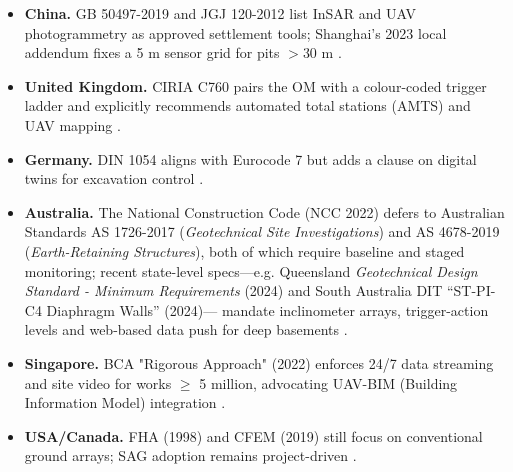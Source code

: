 \documentclass[preprint,11pt,authoryear,3p]{elsarticle}
\begin{document}
\begin{itemize}

    \item \textbf{China.} GB 50497-2019 and JGJ 120-2012 list InSAR and UAV photogrammetry as approved settlement tools; Shanghai's 2023 local addendum fixes a 5 m sensor grid for pits $>30$ m \citep{GB50497:2019,ShanghaiAddendum2023}.

    \item \textbf{United Kingdom.} CIRIA C760 pairs the OM with a colour-coded trigger ladder and explicitly recommends automated total stations (AMTS) and UAV mapping \citep{CIRIA760}.

    \item \textbf{Germany.} DIN 1054 aligns with Eurocode 7 but adds a clause on digital twins for excavation control \citep{DIN1054:2021-04}.
    
    \item \textbf{Australia.}  The National Construction Code (NCC 2022) defers to Australian Standards AS 1726-2017 (\emph{Geotechnical Site Investigations}) and AS 4678-2019 (\emph{Earth-Retaining Structures}), both of which require baseline and staged monitoring; recent state-level specs—e.g. Queensland \emph{Geotechnical Design Standard - Minimum Requirements} (2024) and South Australia DIT “ST-PI-C4 Diaphragm Walls” (2024)— mandate inclinometer arrays, trigger-action levels and web-based data push for deep basements \citep{AS1726,TMR2024,DIT2024}.

    \item \textbf{Singapore.} BCA "Rigorous Approach" (2022) enforces 24/7 data streaming and site video for works $\ge$ 5 million, advocating UAV-BIM (Building Information Model) integration \citep{BCA_Rigorous_Approach_2022}.
  
    \item \textbf{USA/Canada.} FHA (1998) and CFEM (2019) still focus on conventional ground arrays; SAG adoption remains project-driven \citep{FHWA:GEC:Series,CFEM:2023}.

\end{itemize}
\end{document}
